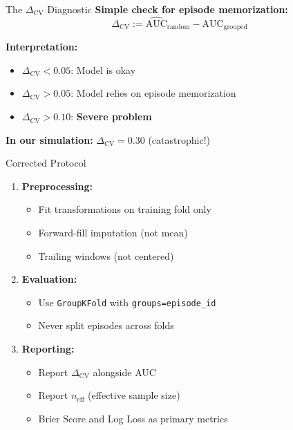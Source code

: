 \documentclass[aspectratio=169]{beamer}
\begin{document}
\begin{frame}{The $\Delta_{\text{CV}}$ Diagnostic}
\textbf{Simple check for episode memorization:}
\[\Delta_{\text{CV}} := \widehat{\text{AUC}}_{\text{random}} - \widehat{\text{AUC}}_{\text{grouped}}\]

\vspace{1em}
\textbf{Interpretation:}
\begin{itemize}
\item $\Delta_{\text{CV}} < 0.05$: Model is okay
\item $\Delta_{\text{CV}} > 0.05$: \alert{Model relies on episode memorization}
\item $\Delta_{\text{CV}} > 0.10$: \alert{\textbf{Severe problem}}
\end{itemize}

\vspace{1em}
\textbf{In our simulation:} $\Delta_{\text{CV}} = 0.30$ (catastrophic!)

\vspace{1em}
\end{frame}

\begin{frame}{Corrected Protocol}
\begin{enumerate}
\item \textbf{Preprocessing:}
\begin{itemize}
\item Fit transformations on training fold only
\item Forward-fill imputation (not mean)
\item Trailing windows (not centered)
\end{itemize}

\vspace{0.5em}
\item \textbf{Evaluation:}
\begin{itemize}
\item Use \texttt{GroupKFold} with \texttt{groups=episode\_id}
\item \alert{Never split episodes across folds}
\end{itemize}

\vspace{0.5em}
\item \textbf{Reporting:}
\begin{itemize}
\item Report $\Delta_{\text{CV}}$ alongside AUC
\item Report $n_{\text{eff}}$ (effective sample size)
\item Brier Score and Log Loss as primary metrics
\end{itemize}
\end{enumerate}
\end{frame}
\end{document}
